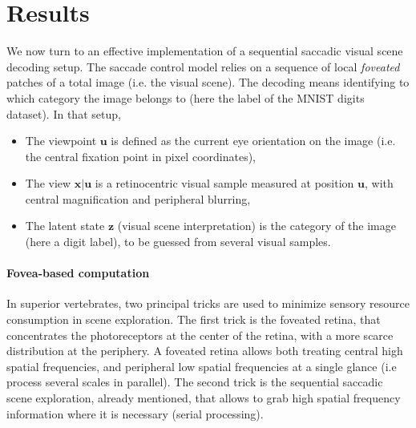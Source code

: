 \documentclass[12pt,twoside,openright]{article}
\begin{document}

% 
%
%

\section{Results} \label{sec:results}

{\color{Purple} We now turn to an effective implementation of a sequential saccadic visual scene decoding setup. The saccade control model relies on a sequence of local \emph{foveated} patches of a total image (i.e. the visual scene). The decoding means identifying to which category the image belongs to (here the label of the MNIST digits dataset). 
In that setup, 
\begin{itemize}
	\item The viewpoint $\boldsymbol{u}$ is defined as the current eye orientation on the image (i.e. the central fixation point in pixel coordinates),
	\item The view $\boldsymbol{x}|\boldsymbol{u}$ is a retinocentric visual sample measured at position $\boldsymbol{u}$, with central magnification and peripheral blurring,
	\item The latent state $\boldsymbol{z}$ (visual scene interpretation) is the category of the image (here a digit label), to be guessed from several visual samples.
\end{itemize} 
}
\paragraph{Fovea-based computation} 
In superior vertebrates, two principal tricks are used to minimize sensory resource consumption in scene exploration. The first trick is the foveated retina, that concentrates the photoreceptors at the center of the retina, with a more scarce distribution at the periphery. A foveated retina allows both treating central high spatial frequencies, and peripheral low spatial frequencies at a single glance (i.e process several scales in parallel). The second trick is the sequential saccadic scene exploration, already mentioned, that allows to grab high spatial frequency information where it is necessary (serial processing).
\end{document}

